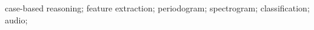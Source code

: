 \begin{IEEEkeywords}
case-based reasoning; feature extraction; periodogram; spectrogram; classification;
audio;
\end{IEEEkeywords}
